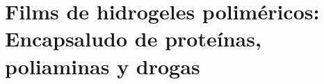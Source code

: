 
\chapter{Films de hidrogeles polim\'ericos: Encapsaludo de prote\'inas, poliaminas y drogas}
\label{Chapter-film} %




